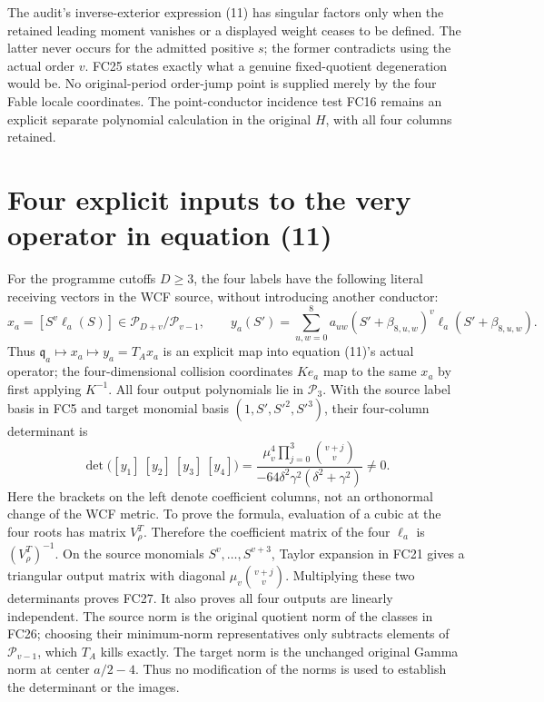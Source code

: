\documentclass[11pt]{article}
\begin{document}
The audit's inverse-exterior expression (11) has singular factors only
when the retained leading moment vanishes or a displayed weight ceases
to be defined. The latter never occurs for the admitted positive $s$;
the former contradicts using the actual order $v$. FC25 states exactly
what a genuine fixed-quotient degeneration would be. No original-period
order-jump point is supplied merely by the four Fable locale coordinates.
The point-conductor incidence test FC16 remains an explicit separate
polynomial calculation in the original $H$, with all four columns retained.

\section{Four explicit inputs to the very operator in equation (11)}
For the programme cutoffs $D\ge3$, the four labels have the following
literal receiving vectors in the WCF source, without introducing another
conductor:
\[
 x_a=[S^v\ell_a(S)]\in\mathcal P_{D+v}/\mathcal P_{v-1},\qquad
 y_a(S')=\sum_{u,w=0}^8 a_{uw}
 (S'+\beta_{8,u,w})^v\ell_a(S'+\beta_{8,u,w}).
 \tag{FC26}
\]
Thus $\mathfrak q_a\mapsto x_a\mapsto y_a=T_Ax_a$ is an explicit
map into equation (11)'s actual operator; the four-dimensional collision
coordinates $Ke_a$ map to the same $x_a$ by first applying $K^{-1}$.
All four output polynomials lie in $\mathcal P_3$.
With the source label basis in FC5 and target monomial basis
$(1,S',S'^2,S'^3)$, their four-column determinant is
\[
 \det\bigl([y_1]\ [y_2]\ [y_3]\ [y_4]\bigr)
 =\frac{\mu_v^4\displaystyle\prod_{j=0}^3\binom{v+j}{v}}
 {-64\delta^2\gamma^2(\delta^2+\gamma^2)}\ne0.
 \tag{FC27}
\]
Here the brackets on the left denote coefficient columns, not an
orthonormal change of the WCF metric. To prove the formula, evaluation
of a cubic at the four roots has matrix $V_\rho^T$. Therefore the
coefficient matrix of the four $\ell_a$ is $(V_\rho^T)^{-1}$.
On the source monomials $S^v,\ldots,S^{v+3}$, Taylor expansion in
FC21 gives a triangular output matrix with diagonal
$\mu_v\binom{v+j}{v}$. Multiplying these two determinants proves
FC27. It also proves all four outputs are linearly independent. The
source norm is the original quotient norm of the classes in FC26;
choosing their minimum-norm representatives only subtracts elements of
$\mathcal P_{v-1}$, which $T_A$ kills exactly. The target norm is the
unchanged original Gamma norm at center $a/2-4$. Thus no modification
of the norms is used to establish the determinant or the images.
\end{document}
